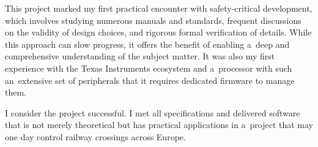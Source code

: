 This project marked my first practical encounter with safety-critical development, which involves studying numerous manuals and standards, frequent discussions on the validity of design choices, and rigorous formal verification of details. While this approach can slow progress, it offers the benefit of enabling a~deep and comprehensive understanding of the subject matter. It was also my first experience with the Texas Instruments ecosystem and a~processor with such an~extensive set of peripherals that it requires dedicated firmware to manage them.

I consider the project successful. I met all specifications and delivered software that is not merely theoretical but has practical applications in a~project that may one day control railway crossings across Europe.